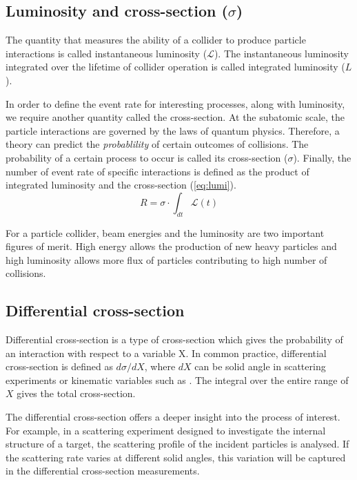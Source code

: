 \subsection*{Luminosity and cross-section ($\sigma$)}
The quantity that measures the ability of a collider to produce particle interactions is called
instantaneous luminosity ($\mathcal{L}$). The instantaneous luminosity integrated over the lifetime
of collider operation is called integrated luminosity ($L$).

In order to define the event rate for interesting processes, along with luminosity, we require
another quantity called the cross-section. At the subatomic scale, the particle interactions 
are governed by the laws of quantum physics. Therefore, a theory can predict 
the \textit{probablility} of certain outcomes of collisions. The probability of a certain
process to occur is called its cross-section ($\sigma$). Finally, the number of event rate of
specific interactions is defined as the product of integrated luminosity and the cross-section (\cref{eq:lumi}).
\begin{equation}
    R = \sigma \cdot \int_{dt} \mathcal{L}(t)
    \label{eq:lumi}
\end{equation}

For a particle collider, beam energies and the luminosity are two important figures of merit. 
High energy allows the production of new heavy particles and high luminosity allows more flux 
of particles contributing to high number of collisions.

\subsection*{Differential cross-section}
Differential cross-section is a type of cross-section which gives the probability of an interaction
with respect to a variable X. In common practice, differential cross-section is defined as $d\sigma/dX$,
where $dX$ can be solid angle in scattering experiments or kinematic variables such as \pT. The 
integral over the entire range of $X$ gives the total cross-section. 

The differential cross-section offers a deeper insight into the process of interest. For example, in a 
scattering experiment designed to investigate the internal structure of a target, the scattering 
profile of the incident particles is analysed. If the scattering rate varies at different solid angles,
 this variation will be captured in the differential cross-section measurements. 

